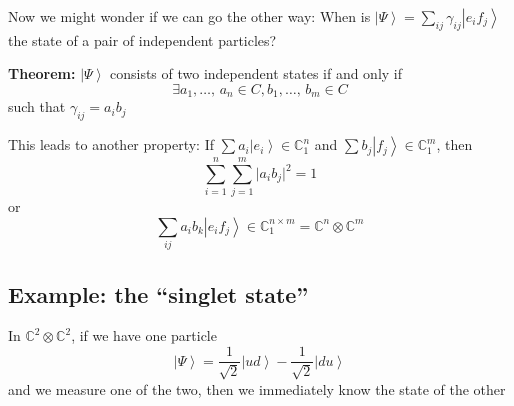 \documentclass[12pt]{article}
\newcommand{\C}{\mathbb{C}}
\newcommand{\ket}[1]{\left\vert #1 \right\rangle}
\begin{document}
Now we might wonder if we can go the other way: When is $\ket \Psi = \sum_{ij} \gamma_{ij} \ket{e_i f_j}$ the state of a pair of independent particles? 

\textbf{Theorem:} $\ket \Psi$ consists of two independent states if and only if 
\[\exists a_1, \dots,\, a_n \in C, b_1, \dots,\, b_m \in C\]
such that $\gamma_{ij} = a_i b_j$

This leads to another property: If $\sum a_i \ket{e_i} \in \C_1^n$ and $\sum b_j \ket{f_j} \in \C_1^m$, then  
    \[\sum_{i=1}^n \sum_{j=1}^m \big\vert a_i b_j \big\vert^2 = 1\] 
    or 
    \[\sum_{ij} a_ib_k \ket{e_i f_j} \in \C_1^{n\times m} = \C^n \otimes \C^m\]

\subsection*{Example: the ``singlet state''}
In $\C^2 \otimes \C^2$, if we have one particle 
\[\ket \Psi = \frac{1}{\sqrt 2} \ket{ud} - \frac{1}{\sqrt 2}\ket{du}\]
and we measure one of the two, then we immediately know the state of the other
\end{document}
